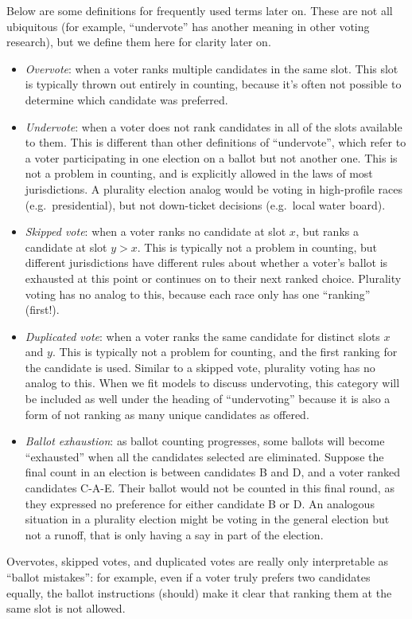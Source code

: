 \documentclass[12pt,twoside]{reedthesis}
\begin{document}
Below are some definitions for frequently used terms later on. These are not all ubiquitous (for example, ``undervote'' has another meaning in other voting research), but we define them here for clarity later on.
\begin{itemize}
\item
  \emph{Overvote}: when a voter ranks multiple candidates in the same slot. This slot is typically thrown out entirely in counting, because it's often not possible to determine which candidate was preferred.
\item
  \emph{Undervote}: when a voter does not rank candidates in all of the slots available to them. This is different than other definitions of ``undervote'', which refer to a voter participating in one election on a ballot but not another one. This is not a problem in counting, and is explicitly allowed in the laws of most jurisdictions. A plurality election analog would be voting in high-profile races (e.g.~presidential), but not down-ticket decisions (e.g.~local water board).
\item
  \emph{Skipped vote}: when a voter ranks no candidate at slot \(x\), but ranks a candidate at slot \(y > x\). This is typically not a problem in counting, but different jurisdictions have different rules about whether a voter's ballot is exhausted at this point or continues on to their next ranked choice. Plurality voting has no analog to this, because each race only has one ``ranking'' (first!).
\item
  \emph{Duplicated vote}: when a voter ranks the same candidate for distinct slots \(x\) and \(y\). This is typically not a problem for counting, and the first ranking for the candidate is used. Similar to a skipped vote, plurality voting has no analog to this. When we fit models to discuss undervoting, this category will be included as well under the heading of ``undervoting'' because it is also a form of not ranking as many unique candidates as offered.
\item
  \emph{Ballot exhaustion}: as ballot counting progresses, some ballots will become ``exhausted'' when all the candidates selected are eliminated. Suppose the final count in an election is between candidates B and D, and a voter ranked candidates C-A-E. Their ballot would not be counted in this final round, as they expressed no preference for either candidate B or D. An analogous situation in a plurality election might be voting in the general election but not a runoff, that is only having a say in part of the election.
\end{itemize}
Overvotes, skipped votes, and duplicated votes are really only interpretable as ``ballot mistakes'': for example, even if a voter truly prefers two candidates equally, the ballot instructions (should) make it clear that ranking them at the same slot is not allowed.
\end{document}
